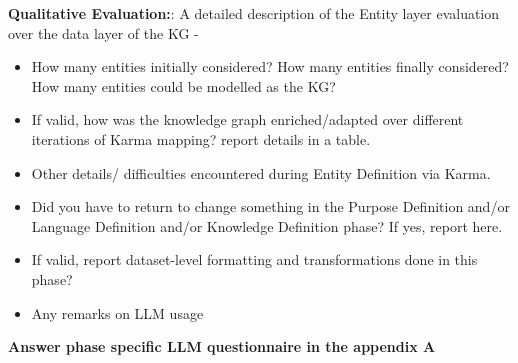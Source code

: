 \noindent \textbf{Qualitative Evaluation:}: A detailed description of the Entity layer evaluation over the data layer of the KG -
\begin{itemize}
    \item How many entities initially considered? How many entities finally considered? How many entities could be modelled as the KG?
    \item If valid, how was the knowledge graph enriched/adapted over different iterations of Karma mapping? report details in a table.
    \item Other details/ difficulties encountered during Entity Definition via Karma.
    \item Did you have to return to change something in the Purpose Definition and/or Language Definition and/or Knowledge Definition phase? If yes, report here.
    \item If valid, report dataset-level formatting and transformations done in this phase?
    \item Any remarks on LLM usage
\end{itemize}

\noindent \textbf{Answer phase specific LLM questionnaire in the appendix A}